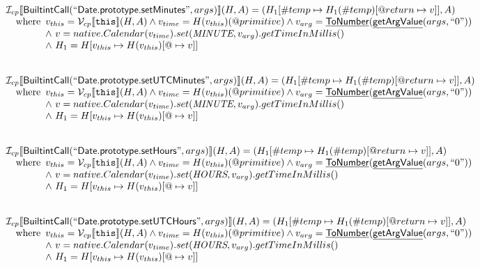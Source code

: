 \documentclass{article}
\makeatletter
\newcommand{\SF}[1]{\mbox{\textsf{#1}}}
\newcommand{\TT}[1]{\mbox{\texttt{#1}}}
\newcommand{\wherec}[1]{{\rm where}\begin{array}[t]{l}#1\end{array}}
\newcommand{\I}{\mathcal{I}}
\newcommand{\V}{\mathcal{V}}
\newcommand{\lbr}{\llbracket}
\newcommand{\rbr}{\rrbracket}
\newcommand{\hf}[1]{\underline{\sf #1}}
\newcommand{\varprop}[1]{@#1}
\makeatother
\begin{document}
\[\begin{array}{l}
\I _{cp}\lbr \SF{BuiltintCall}(``\SF{Date.prototype.setMinutes}",args)\rbr(H,A)
  = (H_1[\#temp \mapsto H_1(\#temp)[@return \mapsto v]], A)\\
\quad\wherec{
  v_{this} = \V _{cp}\lbr \TT{this}\rbr (H,A) \land v_{time} = H(v_{this})(@primitive)
  \land v_{arg} = \hf{ToNumber}(\hf{getArgValue}(args, ``0"))\\
  \land\ v = native.Calendar(v_{time}).set(\emph{MINUTE}, v_{arg}).getTimeInMillis()\\
  \land\ H_1 = H[v_{this} \mapsto H(v_{this})[\varprop \mapsto v]]
  }\\
\\\\


\I _{cp}\lbr \SF{BuiltintCall}(``\SF{Date.prototype.setUTCMinutes}",args)\rbr(H,A)
  = (H_1[\#temp \mapsto H_1(\#temp)[@return \mapsto v]], A)\\
\quad\wherec{
  v_{this} = \V _{cp}\lbr \TT{this}\rbr (H,A) \land v_{time} = H(v_{this})(@primitive)
  \land v_{arg} = \hf{ToNumber}(\hf{getArgValue}(args, ``0"))\\
  \land\ v = native.Calendar(v_{time}).set(\emph{MINUTE}, v_{arg}).getTimeInMillis()\\
  \land\ H_1 = H[v_{this} \mapsto H(v_{this})[\varprop \mapsto v]]
  }\\
\\\\


\I _{cp}\lbr \SF{BuiltintCall}(``\SF{Date.prototype.setHours}",args)\rbr(H,A)
  = (H_1[\#temp \mapsto H_1(\#temp)[@return \mapsto v]], A)\\
\quad\wherec{
  v_{this} = \V _{cp}\lbr \TT{this}\rbr (H,A) \land v_{time} = H(v_{this})(@primitive)
  \land v_{arg} = \hf{ToNumber}(\hf{getArgValue}(args, ``0"))\\
  \land\ v = native.Calendar(v_{time}).set(\emph{HOURS}, v_{arg}).getTimeInMillis()\\
  \land\ H_1 = H[v_{this} \mapsto H(v_{this})[\varprop \mapsto v]]
  }\\
\\\\


\I _{cp}\lbr \SF{BuiltintCall}(``\SF{Date.prototype.setUTCHours}",args)\rbr(H,A)
  = (H_1[\#temp \mapsto H_1(\#temp)[@return \mapsto v]], A)\\
\quad\wherec{
  v_{this} = \V _{cp}\lbr \TT{this}\rbr (H,A) \land v_{time} = H(v_{this})(@primitive)
  \land v_{arg} = \hf{ToNumber}(\hf{getArgValue}(args, ``0"))\\
  \land\ v = native.Calendar(v_{time}).set(\emph{HOURS}, v_{arg}).getTimeInMillis()\\
  \land\ H_1 = H[v_{this} \mapsto H(v_{this})[\varprop \mapsto v]]
  }\\
\\\\



\end{array}
\]
\end{document}
